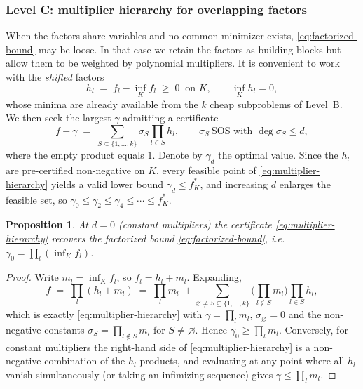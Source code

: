 \documentclass[12pt]{elsarticle}
\newtheorem{proposition}[theorem]{Proposition}
\theoremstyle{definition}
\begin{document}
\subsubsection{Level C: multiplier hierarchy for overlapping factors}\label{subsubsec:levelC}

When the factors share variables and no common minimizer exists, \eqref{eq:factorized-bound} may be loose. In that case we retain the factors as building blocks but allow them to be weighted by polynomial multipliers. It is convenient to work with the \emph{shifted} factors
\begin{equation}\label{eq:shifted-factors}
h_l \;=\; f_l - \inf_{K} f_l \;\ge\; 0 \ \text{ on } K,
\qquad \inf_{K} h_l = 0,
\end{equation}
whose minima are already available from the $k$ cheap subproblems of Level~B. We then seek the largest $\gamma$ admitting a certificate
\begin{equation}\label{eq:multiplier-hierarchy}
f - \gamma
\;=\;
\sum_{S \subseteq \{1,\dots,k\}} \sigma_{S}\prod_{l\in S} h_l,
\qquad \sigma_{S}\ \text{SOS with } \deg \sigma_S \le d,
\end{equation}
where the empty product equals $1$. Denote by $\gamma_d$ the optimal value. Since the $h_l$ are pre-certified non-negative on $K$, every feasible point of \eqref{eq:multiplier-hierarchy} yields a valid lower bound $\gamma_d \le f^{*}_K$, and increasing $d$ enlarges the feasible set, so $\gamma_0 \le \gamma_2 \le \gamma_4 \le \cdots \le f^{*}_{K}$.

\begin{proposition}\label{prop:level-c-base}
At $d=0$ (constant multipliers) the certificate \eqref{eq:multiplier-hierarchy} recovers the factorized bound \eqref{eq:factorized-bound}, i.e.\ $\gamma_0 = \prod_{l}(\inf_K f_l)$.
\end{proposition}

\begin{proof}
Write $m_l = \inf_K f_l$, so $f_l = h_l + m_l$. Expanding,
\[
f \;=\; \prod_{l} (h_l + m_l) \;=\; \prod_l m_l \;+\!\!\sum_{\varnothing\neq S\subseteq\{1,\dots,k\}}\!\!\Big(\prod_{l\notin S} m_l\Big)\prod_{l\in S} h_l ,
\]
which is exactly \eqref{eq:multiplier-hierarchy} with $\gamma=\prod_l m_l$, $\sigma_{\varnothing}=0$ and the non-negative constants $\sigma_S = \prod_{l\notin S} m_l$ for $S\neq\varnothing$. Hence $\gamma_0 \ge \prod_l m_l$. Conversely, for constant multipliers the right-hand side of \eqref{eq:multiplier-hierarchy} is a non-negative combination of the $h_l$-products, and evaluating at any point where all $h_l$ vanish simultaneously (or taking an infimizing sequence) gives $\gamma\le\prod_l m_l$.
\end{proof}
\end{document}
